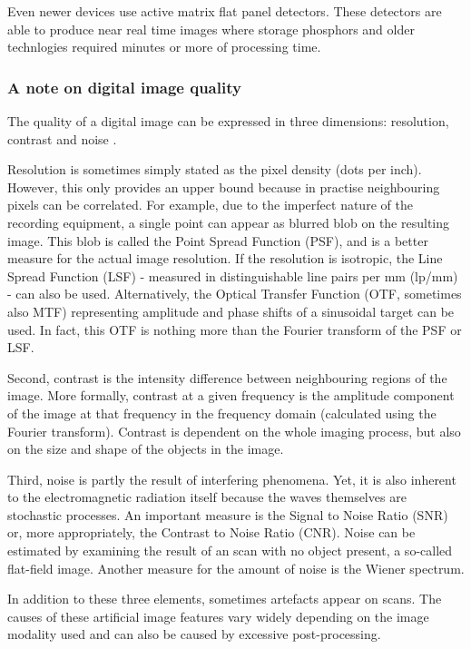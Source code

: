 Even newer devices use active matrix flat panel detectors. These detectors are
able to produce near real time images where storage phosphors and older
technlogies required minutes or more of processing time. %

\subsubsection{A note on digital image quality}
The quality of a digital image can be expressed in three dimensions: resolution,
contrast and noise \cite{suetens}.

Resolution is sometimes simply stated as the pixel density (dots per inch).
However, this only provides an upper bound because in practise neighbouring
pixels can be correlated. For example, due to the imperfect nature of the
recording equipment, a single point can appear as blurred blob on the resulting
image. This blob is called the Point Spread Function (PSF), and is a better
measure for the actual image resolution. If the resolution is isotropic, the
Line Spread Function (LSF) - measured in distinguishable line pairs per mm
(lp/mm) - can also be used. Alternatively, the Optical Transfer Function (OTF,
sometimes also MTF) representing amplitude and phase shifts of a sinusoidal
target can be used. In fact, this OTF is nothing more than the Fourier transform
of the PSF or LSF.

Second, contrast is the intensity difference between neighbouring regions of the
image. More formally, contrast at a given frequency is the amplitude component
of the image at that frequency in the frequency domain (calculated using the
Fourier transform). Contrast is dependent on the whole imaging process, but also
on the size and shape of the objects in the image.

Third, noise is partly the result of interfering phenomena. Yet, it is also
inherent to the electromagnetic radiation itself because the waves themselves
are stochastic processes. An important measure is the Signal to Noise Ratio
(SNR) or, more appropriately, the Contrast to Noise Ratio (CNR). Noise can be
estimated by examining the result of an scan with no object present, a so-called
flat-field image. Another measure for the amount of noise is the Wiener
spectrum.

In addition to these three elements, sometimes artefacts appear on scans. The
causes of these artificial image features vary widely depending on the image
modality used and can also be caused by excessive post-processing.


